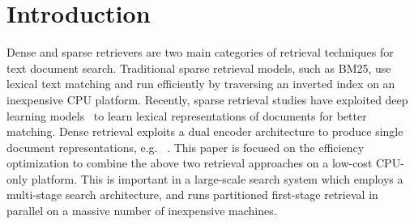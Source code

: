 

\section{Introduction}

\label{sect:intro}
Dense and sparse retrievers are two main categories of retrieval techniques for text  document search.
Traditional sparse retrieval models, such as BM25, use lexical text matching and run
efficiently by traversing  an inverted index on an inexpensive  CPU platform.
Recently, sparse retrieval studies have exploited deep learning models~\cite{Dai2020deepct,
Mallia2021deepimpact, Lin2021unicoil,2021NAACL-Gao-COIL, Formal2021SPLADE, shen2023lexmae} to learn lexical representations of documents for better matching.
Dense retrieval 
exploits a dual encoder architecture to produce single document representations, 
e.g. ~\cite{gao-2021-condenser,2021SIGIR-Zhan-ADORE-dense,Ren2021RocketQAv2, 
Lin2021tctcolbert, Santhanam2021ColBERTv2,  Wang2022SimLM,  Liu2022RetroMAE}.
This paper is focused on the efficiency optimization to combine the above  two retrieval approaches on a low-cost CPU-only platform.
This  is important in a large-scale  search system  which employs  a multi-stage search architecture, and 
runs partitioned first-stage retrieval in parallel  on a massive number of inexpensive machines.  

